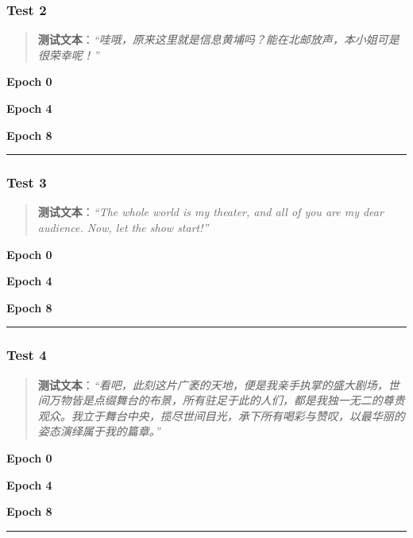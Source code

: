 \documentclass[
  english,
  letterpaper,
  DIV=11,
  numbers=noendperiod]{scrartcl}
\begin{document}
\subsubsection{Test 2}\label{test-2}

\begin{quote}
\textbf{测试文本}：\emph{``哇哦，原来这里就是信息黄埔吗？能在北邮放声，本小姐可是很荣幸呢！''}
\end{quote}

\textbf{Epoch 0}

\textbf{Epoch 4}

\textbf{Epoch 8}

\begin{center}\rule{0.5\linewidth}{0.5pt}\end{center}

\subsubsection{Test 3}\label{test-3}

\begin{quote}
\textbf{测试文本}：\emph{``The whole world is my theater, and all of you
are my dear audience. Now, let the show start!''}
\end{quote}

\textbf{Epoch 0}

\textbf{Epoch 4}

\textbf{Epoch 8}

\begin{center}\rule{0.5\linewidth}{0.5pt}\end{center}

\subsubsection{Test 4}\label{test-4}

\begin{quote}
\textbf{测试文本}：\emph{``看吧，此刻这片广袤的天地，便是我亲手执掌的盛大剧场，世间万物皆是点缀舞台的布景，所有驻足于此的人们，都是我独一无二的尊贵观众。我立于舞台中央，揽尽世间目光，承下所有喝彩与赞叹，以最华丽的姿态演绎属于我的篇章。''}
\end{quote}

\textbf{Epoch 0}

\textbf{Epoch 4}

\textbf{Epoch 8}

\begin{center}\rule{0.5\linewidth}{0.5pt}\end{center}
\end{document}

